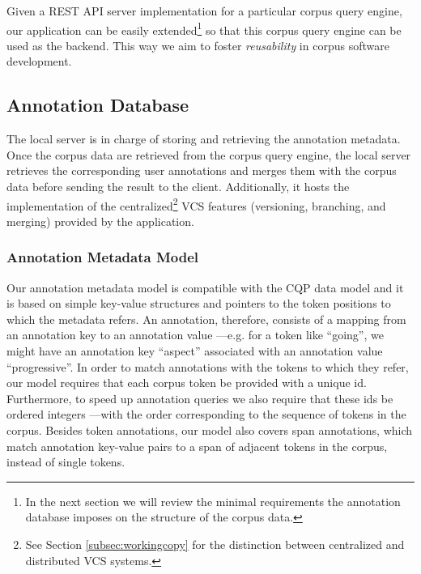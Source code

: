 \documentclass{sig-alternate}
\begin{document}
Given a REST API server implementation for a particular corpus query engine, our application can
be easily extended\footnote{
  In the next section we will review the minimal requirements the annotation database imposes on
the structure of the corpus data.
} so that this corpus query engine can be used as the backend. This way we aim to foster
\textit{reusability} in corpus software development.

\subsection{Annotation Database}\label{subsec:db}
The local server is in charge of storing and retrieving the annotation metadata. Once the corpus data
are retrieved from the corpus query engine, the local server retrieves the corresponding user
annotations and merges them with the corpus data before sending the result to the client.
Additionally, it hosts the implementation of the centralized\footnote{
  See Section \ref{subsec:workingcopy} for the distinction between centralized and distributed
  VCS systems.
} VCS features (versioning, branching, and merging) provided by the application.

\subsubsection{Annotation Metadata Model}\label{subsec:datamodel}

Our annotation metadata model is compatible with the CQP data model \cite{Christ1999} and
it is based on simple key-value structures and pointers to the token
positions to which the metadata refers. An annotation, therefore, consists of a mapping from
an annotation key to an annotation value ---e.g. for a token like ``going'', we might
have an annotation key ``aspect'' associated with an annotation value ``progressive''.
In order to match annotations with the tokens to which they refer, our model requires that
each corpus token be provided with a unique id.
Furthermore, to speed up annotation queries we also require that these ids be ordered integers
---with the order corresponding to the sequence of tokens in the corpus.
Besides token annotations, our model also covers span annotations, which match annotation
key-value pairs to a span of adjacent tokens in the corpus, instead of single tokens.

\end{document}
